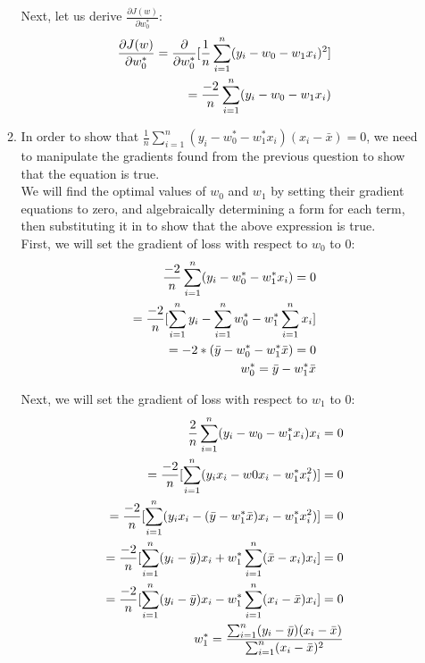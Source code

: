 \documentclass[12pt]{article}
\begin{document}
\begin{enumerate}
\begin{enumerate}
    Next, let us derive $\frac{\partial J(w)}{\partial w^{*}_0}$: \\ 
    \begin{align}
      \frac{\partial J(w)}{\partial w^{*}_0} = \frac{\partial}{\partial w^{*}_0} [\frac{1}{n} \sum_{i=1}^{n} (y_i - w_0 - w_1x_i)^2] \notag \\ 
      = \frac{-2}{n} \sum_{i=1}^{n} (y_i - w_0 - w_1x_i) \notag 
    \end{align}
  \item In order to show that $\frac{1}{n} \sum_{i=1}^{n} (y_i - w^*_0 - w_{1}^{*}x_i)(x_i-\bar{x}) = 0$, 
we need to manipulate the gradients found from the previous question to show that the equation is true. \\

We will find the optimal values of $w_0$ and $w_1$ by setting their gradient equations to zero, and algebraically determining a form for each term, then substituting it in to show that the above expression is true. \\ 

First, we will set the gradient of loss with respect to $w_0$ to 0: \\ 
\begin{align}
  \frac{-2}{n} \sum_{i=1}^{n} (y_i - w_0^* - w_1^*x_i) = 0 \notag \\ 
  = \frac{-2}{n} [\sum_{i=1}^{n} y_i - \sum_{i=1}^{n} w_0^* - w_1^* \sum_{i=1}^{n} x_i] \notag \\
  = -2 * (\bar{y} - w_0^* - w_1^* \bar{x}) = 0 \notag \\ 
  w_0^* = \bar{y} - w_1^* \bar{x} \notag
\end{align}

Next, we will set the gradient of loss with respect to $w_1$ to 0: \\ 
\begin{align}
  \frac{2}{n} \sum_{i=1}^{n} (y_i - w_0 - w_1^*x_i) x_i = 0 \notag \\ 
  = \frac{-2}{n} [\sum_{i=1}^{n} (y_ix_i - w0x_i - w_1^*x_i^2)] = 0 \notag \\ 
  = \frac{-2}{n} [\sum_{i=1}^{n} (y_ix_i - (\bar{y} - w_1^* \bar{x}) x_i - w_1^*x_i^2)] = 0  \notag \\ 
  = \frac{-2}{n} [\sum_{i=1}^{n} (y_i - \bar{y})x_i + w_1^* \sum_{i=1}^{n} (\bar{x} - x_i)x_i] = 0 \notag \\ 
  = \frac{-2}{n} [\sum_{i=1}^{n} (y_i - \bar{y})x_i - w_1^* \sum_{i=1}^{n} (x_i-\bar{x})x_i] = 0 \notag \\ 
  w_1^* = \frac{\sum_{i=1}^{n} (y_i - \bar{y})(x_i - \bar{x})}{\sum_{i=1}^{n} (x_i-\bar{x})^2} \notag
 \end{align}


\end{enumerate}
\end{enumerate}
\end{document}
